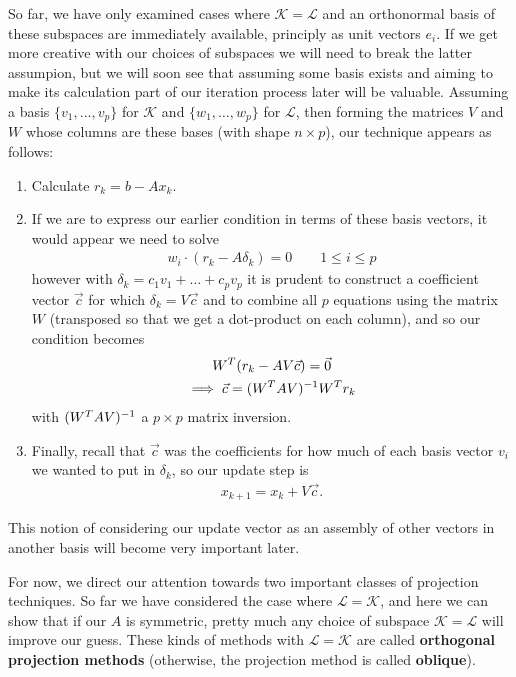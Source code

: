 \documentclass[11pt]{article}
\begin{document}
So far, we have only examined cases where $\mathcal{K} = \mathcal{L}$ and an orthonormal basis of these subspaces are immediately available, principly as unit vectors $e_i$. If we get more creative with our choices of subspaces we will need to break the latter assumpion, but we will soon see that assuming some basis exists and aiming to make its calculation part of our iteration process later will be valuable. Assuming a basis $\{v_1, ..., v_p \}$ for $\mathcal{K}$ and $\{w_1, \dots, w_p\}$ for $\mathcal{L}$, then forming the matrices $V$ and $W$ whose columns are these bases (with shape $n \times p$), our technique appears as follows: \begin{enumerate}
\item Calculate $r_k = b - Ax_k$.
\item If we are to express our earlier condition in terms of these basis vectors, it would appear we need to solve \begin{gather*}
w_i \cdot (r_k - A\delta_k) = 0 \hspace{2em} 1 \le i \le p
\end{gather*}
however with $\delta_k = c_1 v_1 + ... + c_p v_p$ it is prudent to construct a coefficient vector $\vec c$ for which $\delta_k = V \vec c$ and to combine all $p$ equations using the matrix $W$ (transposed so that we get a dot-product on each column), and so our condition becomes
\begin{gather*}
W^T (r_k - AV \vec c) = \vec 0 \\
\implies \vec c = (W^T A V)^{-1} W^T r_k
\end{gather*}
with $(W^T A V)^{-1}$ a $p \times p$ matrix inversion.
\item Finally, recall that $\vec c$ was the coefficients for how much of each basis vector $v_i$ we wanted to put in $\delta_k$, so our update step is \begin{gather*}
x_{k+1} = x_k + V \vec c.
\end{gather*}
\end{enumerate}

This notion of considering our update vector as an assembly of other vectors in another basis will become very important later.

For now, we direct our attention towards two important classes of projection techniques. So far we have considered the case where $\mathcal{L} = \mathcal{K}$, and here we can show that if our $A$ is symmetric, pretty much any choice of subspace $\mathcal{K} = \mathcal{L}$ will improve our guess. These kinds of methods with $\mathcal L = \mathcal K$ are called \textbf{orthogonal projection methods} (otherwise, the projection method is called \textbf{oblique}).
\end{document}
